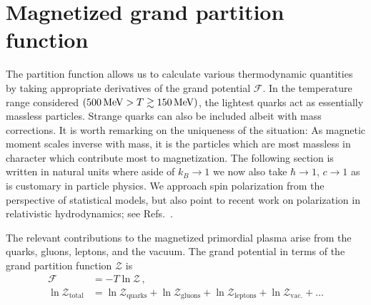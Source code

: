 \documentclass[epjST]{svjour}
\newcommand*{\MeV}{\text{\,MeV}}
\begin{document}
\section{Magnetized grand partition function}
\label{sec:partition}
The partition function allows us to calculate various thermodynamic quantities by taking appropriate derivatives of the grand potential $\mathcal{F}$. In the temperature range considered $(500\MeV>T\gtrsim150\MeV)$, the lightest quarks act as essentially massless particles. Strange quarks can also be included albeit with mass corrections. It is worth remarking on the uniqueness of the situation: As magnetic moment scales inverse with mass, it is the particles which are most massless in character which contribute most to magnetization. The following section is written in natural units {\color{blue} where aside of \(k_{B}\to 1\) we now also take \(\hbar\to 1,\,c\to 1\) as is customary in particle physics. We approach spin polarization from the perspective of statistical models, but also point to recent work on polarization in relativistic hydrodynamics; see Refs.~\cite{Florkowski:2024cif,Bhadury:2024whs,Becattini:2024uha,Singh:2024cub}.}

The relevant contributions to the magnetized primordial plasma arise from the quarks, gluons, leptons, and the vacuum. The grand potential in terms of the grand partition function $\mathcal{Z}$ is
\begin{align}
\label{eq:parts}
\mathcal{F} &= -T\ln\mathcal{Z}\,,\\
\ln\mathcal{Z}_{\mathrm{total}} &=
\ln\mathcal{Z}_{\mathrm{quarks}} +
\ln\mathcal{Z}_{\mathrm{gluons}} +
\ln\mathcal{Z}_{\mathrm{leptons}}+
\ln\mathcal{Z}_{\mathrm{vac.}}+\ldots 
\end{align}

\end{document}
